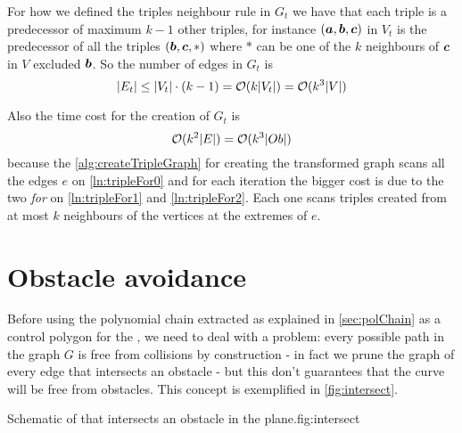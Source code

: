 \documentclass[dissertation.tex]{subfiles}
\begin{document}
For how we defined the triples neighbour rule in $G_t$ we have
that each triple is a predecessor of maximum $k-1$ other triples, for
instance $(\boldsymbol{a},\boldsymbol{b},\boldsymbol{c})$ in $V_t$ is the predecessor of all the triples
$(\boldsymbol{b},\boldsymbol{c},*)$ where $*$ can be one of the $k$ neighbours
of $\boldsymbol{c}$ in $V$ excluded $\boldsymbol{b}$. So the number of edges in $G_t$ is
\begin{equation}
  \label{eq:numEdgesTriples}
  |E_t|\leq |V_t|\cdot (k-1)=\mathcal{O}(k|V_t|)=\mathcal{O}(k^3|V|)
\end{equation}

Also the time cost for the creation of $G_t$ is
\newcommand{\eqCostVt}{\ensuremath{\bigO(k^3|Ob|)}}
\begin{equation}
  \label{eq:costVt}
  \bigO(k^2|E|)=\eqCostVt
\end{equation}
because the \cref{alg:createTripleGraph} for creating the transformed
graph scans all the edges $e$ on \cref{ln:tripleFor0} and for each
iteration
the bigger cost is due to the two \emph{for} on \cref{ln:tripleFor1} and
\cref{ln:tripleFor2}. Each one scans triples created from at most
$k$ neighbours
of the vertices at the extremes of $e$.

\section{Obstacle avoidance}\label{sec:obsAvoid}
Before using the polynomial chain extracted as
explained in \cref{sec:polChain} as a control polygon for the
\bs, we need to deal with a
problem: every possible path in the graph $G$ is
free from collisions by construction - in fact we prune the graph of
every edge that intersects an obstacle - but this don't guarantees that
the curve will be free from obstacles. This concept is exemplified in
\cref{fig:intersect}.
\begin{myfig}{Schematic of \bs that intersects an obstacle in the plane.}{fig:intersect}
\end{myfig}
\end{document}
